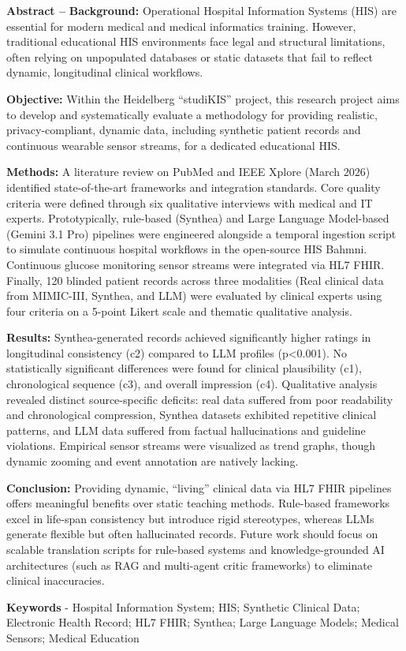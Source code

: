 \textbf{Abstract --}
\textbf{Background:} Operational Hospital Information Systems (HIS) are essential for modern medical and medical informatics training. However, traditional educational HIS environments face legal and structural limitations, often relying on unpopulated databases or static datasets that fail to reflect dynamic, longitudinal clinical workflows.

\noindent\textbf{Objective:} Within the Heidelberg \enquote{studiKIS} project, this research project aims to develop and systematically evaluate a methodology for providing realistic, privacy-compliant, dynamic data, including synthetic patient records and continuous wearable sensor streams, for a dedicated educational HIS.

\noindent\textbf{Methods:} A literature review on PubMed and IEEE Xplore (March 2026) identified state-of-the-art frameworks and integration standards. Core quality criteria were defined through six qualitative interviews with medical and IT experts. Prototypically, rule-based (Synthea) and Large Language Model-based (Gemini 3.1 Pro) pipelines were engineered alongside a temporal ingestion script to simulate continuous hospital workflows in the open-source HIS Bahmni. Continuous glucose monitoring sensor streams were integrated via HL7 FHIR. Finally, 120 blinded patient records across three modalities (Real clinical data from MIMIC-III, Synthea, and LLM) were evaluated by clinical experts using four criteria on a 5-point Likert scale and thematic qualitative analysis.

\noindent\textbf{Results:} Synthea-generated records achieved significantly higher ratings in longitudinal consistency (c2) compared to LLM profiles (p<0.001). No statistically significant differences were found for clinical plausibility (c1), chronological sequence (c3), and overall impression (c4). Qualitative analysis revealed distinct source-specific deficits: real data suffered from poor readability and chronological compression, Synthea datasets exhibited repetitive clinical patterns, and LLM data suffered from factual hallucinations and guideline violations. Empirical sensor streams were visualized as trend graphs, though dynamic zooming and event annotation are natively lacking.

\noindent\textbf{Conclusion:} Providing dynamic, \enquote{living} clinical data via HL7 FHIR pipelines offers meaningful benefits over static teaching methods. Rule-based frameworks excel in life-span consistency but introduce rigid stereotypes, whereas LLMs generate flexible but often hallucinated records. Future work should focus on scalable translation scripts for rule-based systems and knowledge-grounded AI architectures (such as RAG and multi-agent critic frameworks) to eliminate clinical inaccuracies.
    
    \smallskip
    \smallskip
    
\noindent\textbf{Keywords} -  Hospital Information System; HIS; Synthetic Clinical Data; Electronic Health Record; HL7 FHIR; Synthea; Large Language Models; Medical Sensors; Medical Education
